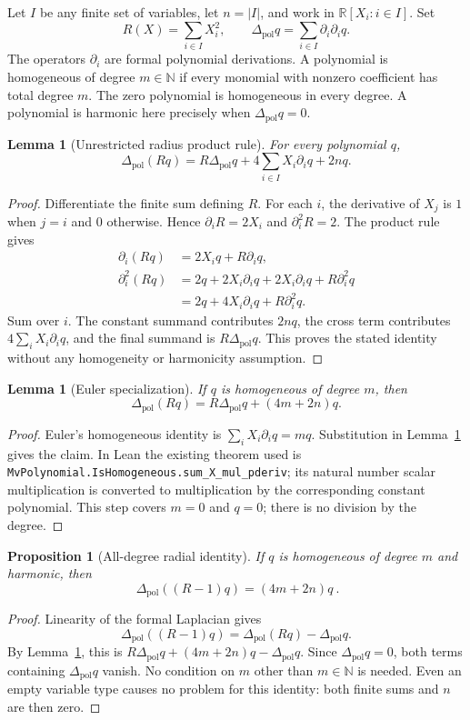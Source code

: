 \documentclass[11pt]{article}
\newtheorem{lemma}[theorem]{Lemma}
\newtheorem{proposition}[theorem]{Proposition}
\theoremstyle{definition}
\theoremstyle{remark}
\newcommand{\R}{\mathbb R}
\numberwithin{equation}{section}
\providecommand{\Lap}{\Delta_{\mathrm{pol}}}
\begin{document}
Let $I$ be any finite set of variables, let $n=|I|$, and work in
$\R[X_i:i\in I]$.  Set
\[
 R(X)=\sum_{i\in I}X_i^2,\qquad
 \Lap q=\sum_{i\in I}\partial_i\partial_i q.
\]
The operators $\partial_i$ are formal polynomial derivations.  A
polynomial is homogeneous of degree $m\in\mathbb N$ if every monomial
with nonzero coefficient has total degree $m$.  The zero polynomial is
homogeneous in every degree.  A polynomial is harmonic here precisely
when $\Lap q=0$.

\begin{lemma}[Unrestricted radius product rule]\label{polynomial:product}
For every polynomial $q$,
\[
 \Lap(Rq)=R\Lap q+4\sum_{i\in I}X_i\partial_iq+2nq.
\]
\end{lemma}
\begin{proof}
Differentiate the finite sum defining $R$.  For each $i$, the derivative
of $X_j$ is $1$ when $j=i$ and $0$ otherwise.  Hence
$\partial_iR=2X_i$ and $\partial_i^2R=2$.  The product rule gives
\begin{align*}
 \partial_i(Rq)&=2X_iq+R\partial_iq,\\
 \partial_i^2(Rq)
 &=2q+2X_i\partial_iq+2X_i\partial_iq+R\partial_i^2q\\
 &=2q+4X_i\partial_iq+R\partial_i^2q.
\end{align*}
Sum over $i$.  The constant summand contributes $2nq$, the cross term
contributes $4\sum_iX_i\partial_iq$, and the final summand is
$R\Lap q$.  This proves the stated identity without any homogeneity or
harmonicity assumption.
\end{proof}

\begin{lemma}[Euler specialization]\label{polynomial:euler}
If $q$ is homogeneous of degree $m$, then
\[
 \Lap(Rq)=R\Lap q+(4m+2n)q.
\]
\end{lemma}
\begin{proof}
Euler's homogeneous identity is
$\sum_iX_i\partial_iq=mq$.  Substitution in
Lemma~\ref{polynomial:product} gives the claim.  In Lean the existing
theorem used is
\texttt{MvPolynomial.IsHomogeneous.sum\_X\_mul\_pderiv}; its natural
number scalar multiplication is converted to multiplication by the
corresponding constant polynomial.  This step covers $m=0$ and $q=0$;
there is no division by the degree.
\end{proof}

\begin{proposition}[All-degree radial identity]\label{polynomial:radial}
If $q$ is homogeneous of degree $m$ and harmonic, then
\[
 \boxed{\ \Lap((R-1)q)=(4m+2n)q\ }.
\]
\end{proposition}
\begin{proof}
Linearity of the formal Laplacian gives
\[
 \Lap((R-1)q)=\Lap(Rq)-\Lap q.
\]
By Lemma~\ref{polynomial:euler}, this is
$R\Lap q+(4m+2n)q-\Lap q$.  Since $\Lap q=0$, both terms containing
$\Lap q$ vanish.  No condition on $m$ other than $m\in\mathbb N$ is
needed.  Even an empty variable type causes no problem for this identity:
both finite sums and $n$ are then zero.
\end{proof}
\end{document}

